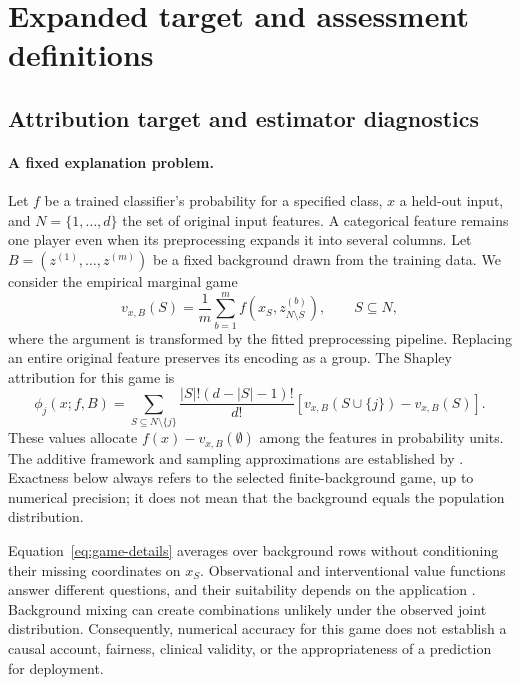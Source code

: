 \section{Expanded target and assessment definitions}
\label{app:definitions}
\subsection{Attribution target and estimator diagnostics}

\paragraph{A fixed explanation problem.}
Let $f$ be a trained classifier's probability for a specified class, $x$ a held-out input, and $N=\{1,\ldots,d\}$ the set of original input features. A categorical feature remains one player even when its preprocessing expands it into several columns. Let $B=(z^{(1)},\ldots,z^{(m)})$ be a fixed background drawn from the training data. We consider the empirical marginal game
\begin{equation}
 v_{x,B}(S)=\frac{1}{m}\sum_{b=1}^{m}
 f\!\left(x_S,z^{(b)}_{N\setminus S}\right),\qquad S\subseteq N,
 \label{eq:game-details}
\end{equation}
where the argument is transformed by the fitted preprocessing pipeline. Replacing an entire original feature preserves its encoding as a group. The Shapley attribution for this game is
\begin{equation}
 \phi_j(x;f,B)=\sum_{S\subseteq N\setminus\{j\}}
 \frac{|S|!(d-|S|-1)!}{d!}
 \left[v_{x,B}(S\cup\{j\})-v_{x,B}(S)\right].
 \label{eq:shapley}
\end{equation}
These values allocate $f(x)-v_{x,B}(\emptyset)$ among the features in probability units. The additive framework and sampling approximations are established by \citet{lundberg2017unified}. Exactness below always refers to the selected finite-background game, up to numerical precision; it does not mean that the background equals the population distribution.

Equation~\eqref{eq:game-details} averages over background rows without conditioning their missing coordinates on $x_S$. Observational and interventional value functions answer different questions, and their suitability depends on the application \citep{chen2020true}. Background mixing can create combinations unlikely under the observed joint distribution. Consequently, numerical accuracy for this game does not establish a causal account, fairness, clinical validity, or the appropriateness of a prediction for deployment.


